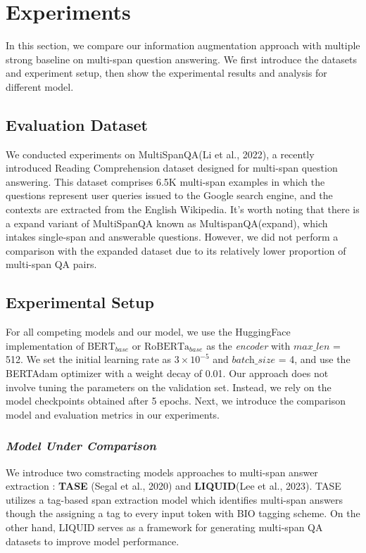 
\section{Experiments}
In this section, we compare our information augmentation approach with multiple strong baseline on multi-span question answering. We first introduce the datasets and experiment setup, then show the experimental results and analysis for different model.

\subsection{Evaluation Dataset}
\label{sec:datasets}
We conducted experiments on MultiSpanQA(Li et al., 2022), a recently introduced Reading Comprehension dataset designed for multi-span question answering. This dataset comprises 6.5K multi-span examples in which the questions represent user queries issued to the Google search engine, and the contexts are extracted from the English Wikipedia. It's worth noting that there is a expand variant of MultiSpanQA known as MultispanQA(expand), which intakes single-span and answerable questions. However, we did not perform a comparison with the expanded dataset due to its relatively lower proportion of multi-span QA pairs.

\subsection{Experimental Setup}
For all competing models and our model, we use the HuggingFace implementation of $\text{BERT}_{base}$ or $\text{RoBERTa}_{base}$ as the \textit{encoder} with $\textit{max\_len}$ = 512. We set the initial learning rate as $3 \times 10^{-5}$ and  $\textit{batch\_size}$ = 4, and use the BERTAdam optimizer with a weight decay of 0.01. Our approach does not involve tuning the parameters on the validation set. Instead, we rely on the model checkpoints obtained after 5 epochs. Next, we introduce the comparison model and evaluation metrics in our experiments.

\subsubsection{\textit{Model Under Comparison}}
\label{sec:baselines}
We introduce two comstracting models approaches to multi-span answer extraction : \textbf{TASE} (Segal et al., 2020) and \textbf{LIQUID}(Lee et al., 2023). TASE utilizes a tag-based span extraction model which identifies multi-span answers though the assigning a tag to every input token with BIO tagging scheme. On the other hand, LIQUID serves as a framework for generating multi-span QA datasets to improve model performance.

